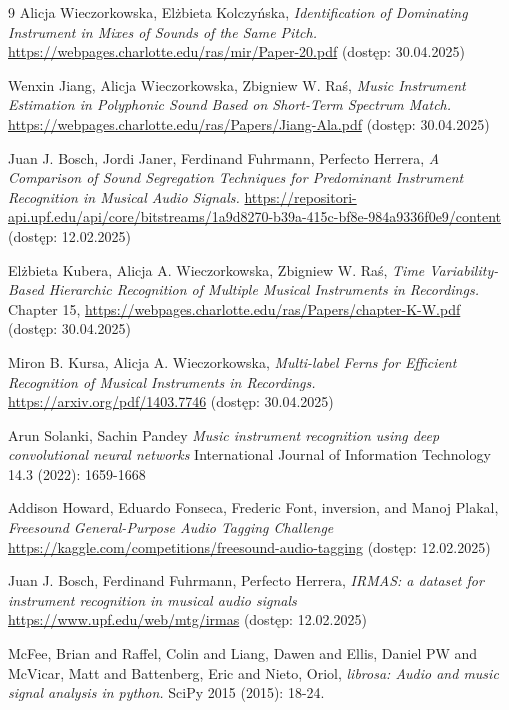 \documentclass{SGGW-thesis}
\begin{document}
\begin{thebibliography}{9}
Alicja Wieczorkowska, Elżbieta Kolczyńska, \textit{Identification of Dominating Instrument in Mixes of Sounds of the Same Pitch.} \url{https://webpages.charlotte.edu/ras/mir/Paper-20.pdf} (dostęp: 30.04.2025)

Wenxin Jiang, Alicja Wieczorkowska, Zbigniew W. Raś, \textit{Music Instrument Estimation in Polyphonic Sound Based on Short-Term Spectrum Match.} \url{https://webpages.charlotte.edu/ras/Papers/Jiang-Ala.pdf} (dostęp: 30.04.2025)

Juan J. Bosch, Jordi Janer, Ferdinand Fuhrmann, Perfecto Herrera, \textit{A Comparison of Sound Segregation Techniques for Predominant Instrument Recognition in Musical Audio Signals.} \url{https://repositori-api.upf.edu/api/core/bitstreams/1a9d8270-b39a-415c-bf8e-984a9336f0e9/content} (dostęp: 12.02.2025)

Elżbieta Kubera, Alicja A. Wieczorkowska, Zbigniew W. Raś, \textit{Time Variability-Based Hierarchic Recognition of Multiple Musical Instruments in Recordings.} Chapter 15, \url{https://webpages.charlotte.edu/ras/Papers/chapter-K-W.pdf} (dostęp: 30.04.2025)

Miron B. Kursa, Alicja A. Wieczorkowska, \textit{Multi-label Ferns for Efficient Recognition of Musical Instruments in Recordings.} \url{https://arxiv.org/pdf/1403.7746} (dostęp: 30.04.2025)

Arun Solanki, Sachin Pandey \textit{Music instrument recognition using deep convolutional neural networks} International Journal of Information Technology 14.3 (2022): 1659-1668

Addison Howard, Eduardo Fonseca, Frederic Font, inversion, and Manoj Plakal,  \textit{Freesound General-Purpose Audio Tagging Challenge} \url{https://kaggle.com/competitions/freesound-audio-tagging} (dostęp: 12.02.2025)

Juan J. Bosch, Ferdinand Fuhrmann, Perfecto Herrera, \textit{IRMAS: a dataset for instrument recognition in musical audio signals} \url{https://www.upf.edu/web/mtg/irmas} (dostęp: 12.02.2025)

McFee, Brian and Raffel, Colin and Liang, Dawen and Ellis, Daniel PW and McVicar, Matt and Battenberg, Eric and Nieto, Oriol, \textit{librosa: Audio and music signal analysis in python.} SciPy 2015 (2015): 18-24.


\end{thebibliography}
\end{document}
